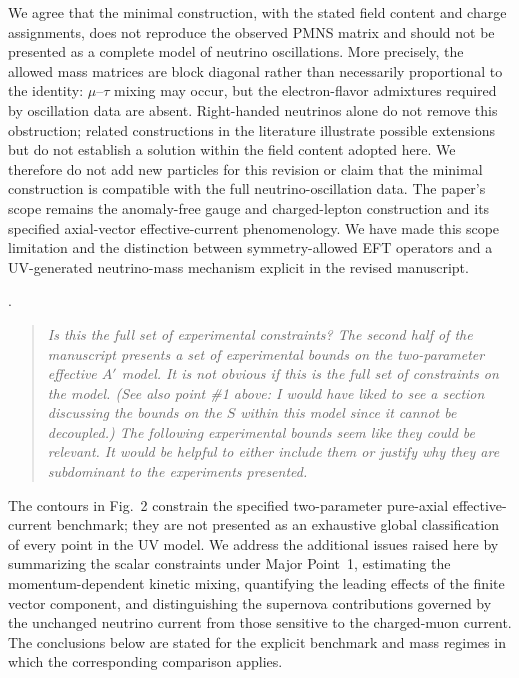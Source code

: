 \documentclass[12pt,a4paper]{article}
\begin{document}

We agree that the minimal construction, with the stated field content and charge assignments, does not reproduce the observed PMNS matrix and should not be presented as a complete model of neutrino oscillations. More precisely, the allowed mass matrices are block diagonal rather than necessarily proportional to the identity: \(\mu\)--\(\tau\) mixing may occur, but the electron-flavor admixtures required by oscillation data are absent. Right-handed neutrinos alone do not remove this obstruction; related constructions in the literature illustrate possible extensions but do not establish a solution within the field content adopted here. We therefore do not add new particles for this revision or claim that the minimal construction is compatible with the full neutrino-oscillation data. The paper's scope remains the anomaly-free gauge and charged-lepton construction and its specified axial-vector effective-current phenomenology. We have made this scope limitation and the distinction between symmetry-allowed EFT operators and a UV-generated neutrino-mass mechanism explicit in the revised manuscript.

\medskip
{}.
\begin{quote}\itshape
Is this the full set of experimental constraints? The second half of the manuscript presents a set of experimental bounds on the two-parameter effective \(A'\) model. It is not obvious if this is the full set of constraints on the model. (See also point \#1 above: I would have liked to see a section discussing the bounds on the \(S\) within this model since it cannot be decoupled.) The following experimental bounds seem like they could be relevant. It would be helpful to either include them or justify why they are subdominant to the experiments presented.
\end{quote}


The contours in Fig.~2 constrain the specified two-parameter pure-axial effective-current benchmark; they are not presented as an exhaustive global classification of every point in the UV model. We address the additional issues raised here by summarizing the scalar constraints under Major Point~1, estimating the momentum-dependent kinetic mixing, quantifying the leading effects of the finite vector component, and distinguishing the supernova contributions governed by the unchanged neutrino current from those sensitive to the charged-muon current. The conclusions below are stated for the explicit benchmark and mass regimes in which the corresponding comparison applies.
\end{document}
